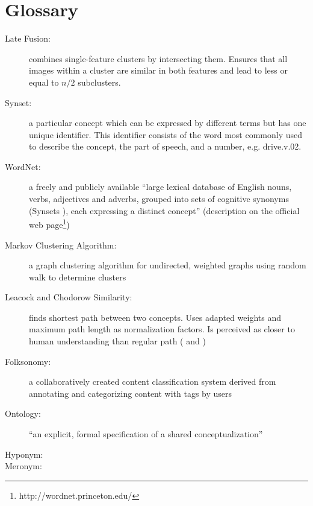 \section{Glossary} %

\begin{description}
\item[Late Fusion:] combines single-feature clusters by intersecting them. Ensures that all images within a cluster are similar in both features and lead to less or equal to $n/2$ subclusters.

\item[Synset:] a particular concept which can be expressed by different terms but has one unique identifier. This identifier consists of the word most commonly used to describe the concept, the part of speech, and a number, e.g. drive.v.02.

\item[WordNet:] a freely and publicly available ``large lexical database of English nouns, verbs, adjectives and adverbs, grouped into sets of cognitive synonyms (Synsets ), each expressing a distinct concept'' (description on the official web page\footnote{http://wordnet.princeton.edu/})

\item[Markov Clustering Algorithm:] a graph clustering algorithm for undirected, weighted graphs using random walk to determine clusters

\item[Leacock and Chodorow Similarity:] finds shortest path between two concepts. Uses adapted weights and maximum path length as normalization factors. Is perceived as closer to human understanding than regular path (\cite{budanitsky01} and \cite{pedersen2004wordnet})

\item[Folksonomy:] a collaboratively created content classification system derived from annotating and categorizing content with tags by users

\item[Ontology:] ``an explicit, formal specification of a shared conceptualization'' \cite{gruber1993translation}

\item[Hyponym:]

\item[Meronym:]

\end{description}


